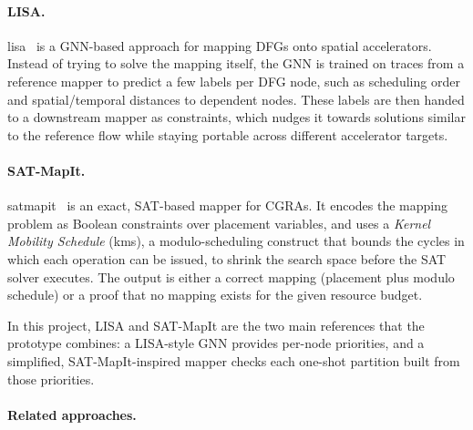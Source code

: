 \documentclass[10pt]{article}
\begin{document}
\paragraph{LISA.}
\gls{lisa}~\cite{lisa2022} is a GNN-based approach for mapping DFGs onto spatial accelerators. Instead of trying to solve the mapping itself, the GNN is trained on traces from a reference mapper to predict a few labels per DFG node, such as scheduling order and spatial/temporal distances to dependent nodes. These labels are then handed to a downstream mapper as constraints, which nudges it towards solutions similar to the reference flow while staying portable across different accelerator targets.

\paragraph{SAT-MapIt.}
\gls{satmapit}~\cite{satmapit2023} is an exact, SAT-based mapper for CGRAs. It encodes the mapping problem as Boolean constraints over placement variables, and uses a \textit{Kernel Mobility Schedule} (\gls{kms}), a modulo-scheduling construct that bounds the cycles in which each operation can be issued, to shrink the search space before the SAT solver executes. The output is either a correct mapping (placement plus modulo schedule) or a proof that no mapping exists for the given resource budget.

In this project, LISA and SAT-MapIt are the two main references that the prototype combines: a LISA-style GNN provides per-node priorities, and a simplified, SAT-MapIt-inspired mapper checks each one-shot partition built from those priorities.

\paragraph{Related approaches.}
\end{document}
